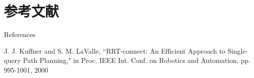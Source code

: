 \documentclass[8pt, dvipdfmx]{beamer}
\begin{document}
\section{参考文献}
\begin{frame}{References}

\begin{thebibliography}{99}
\beamertemplatetextbibitems

J. J. Kuffner and S. M. LaValle, ``RRT-connect: An Efficient Approach to Single-query Path Planning," in Proc. IEEE Int. Conf. on Robotics and Automation, pp. 995-1001, 2000

\end{thebibliography}

\end{frame}
\end{document}

